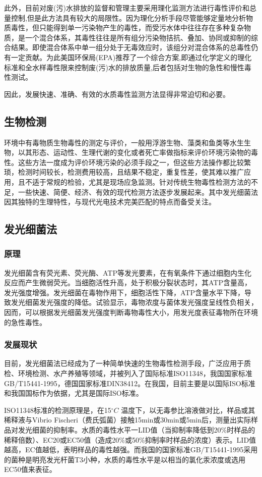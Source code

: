 	此外，目前对废(污)水排放的监督和管理主要采用理化监测方法进行毒性评价和总量控制,但是此方法具有较大的局限性。因为理化分析手段尽管能够定量地分析物质毒性，但只能得到单一污染物产生的毒性，而受污水体中往往存在多种复杂物质，是一个混合体系，其毒性往往是所有组分污染物拮抗、叠加、协同或抑制的综合结果。即使混合体系中单一组分处于无毒效应时，该组分对混合体系的总毒性仍有一定贡献。\cite{thesingle}为此美国环保局(EPA)推荐了一个综合方案,即通过化学定义的理化标准和全水样毒性限来控制废(污)水的排放质量,后者包括对生物的急性和慢性毒性测试。\cite{waterpolicy}
	
	因此，发展快速、准确、有效的水质毒性监测方法显得非常迫切和必要。	
\subsection{生物检测}
	环境中有毒物质生物毒性的测定与评价，一般用浮游生物、藻类和鱼类等水生生物，以其形态、运动性、生理代谢的变化或者死亡率做指标来评价环境污染物的毒性。这些方法一度成为评价环境污染的必须手段之一，但这些方法操作都比较繁琐，检测时间较长，检测费用较高，且结果不稳定，重复性差，使其难以推广应用，且不适于常规的检验，尤其是现场应急监测。\cite{faguang}针对传统生物毒性检测方法的不足，一些快速、简便、经济、有效的现代检测方法逐步发展起来。其中发光细菌法因其独特的生理特性，与现代光电技术完美匹配的特点而备受关注。
\subsection{发光细菌法}
\subsubsection{原理}
	发光细菌含有荧光素、荧光酶、ATP等发光要素，在有氧条件下通过细胞内生化反应而产生微弱荧光。当细胞活性升高，处于积极分裂状态时，其ATP含量高，发光强度增强。发光细菌在毒物作用下，细胞活性下降，ATP含量水平下降，导致发光细菌发光强度的降低。试验显示，毒物浓度与菌体发光强度呈线性负相关，因而，可以根据发光细菌发光强度判断毒物毒性大小，用发光度表征毒物所在环境的急性毒性。\cite{yingyong}
\subsubsection{发展现状}	
	目前，发光细菌法已经成为了一种简单快速的生物毒性检测手段，广泛应用于质检、环境检测、水产养殖等领域，并被列入了国际标准ISO11348，我国国家标准GB/T15441-1995，德国国家标准DIN38412。在我国，目前主要是以国际ISO标准和我国国标作为依据，尤其是国际ISO标准。
	
	ISO11348标准的检测原理是，在15$^{\circ}C$ 温度下，以无毒参比溶液做对比，样品或其稀释液与Vibrio Fischeri（费氏弧菌）接触15min或30min或5min后，测量出实际样品对发光细菌的抑制率。水质的毒性水平一LID值（当抑制率降低到20\%时样品的稀释倍数）、EC20或EC50值（造成20\%或50\%抑制率时样品的浓度）表示。LID值越高，EC值越低，表明样品的毒性越强。而我国的国家标准GB/T15441-1995采用的菌种是明亮发光杆菌T3小种，水质的毒性水平是以相当的氯化汞浓度或选用EC50值来表征。
	
